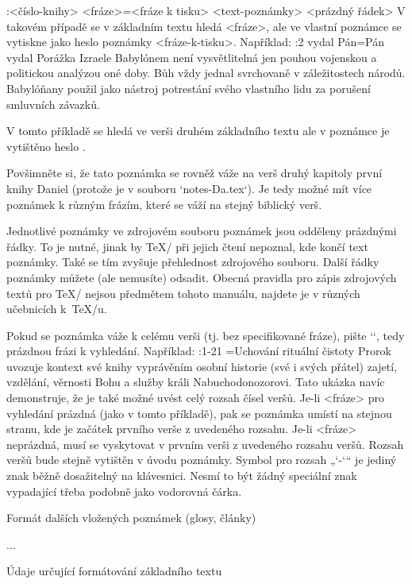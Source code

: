\begtt
{}:<číslo-knihy> {<fráze>}={<fráze k tisku>} <text-poznámky> 
<prázdný řádek>
\endtt
V takovém případě se v základním textu hledá <fráze>, ale ve vlastní
poznámce se vytiskne jako heslo poznámky <fráze-k-tisku>. Například:
\begtt
{}:2 {vydal Pán}={Pán vydal} Porážka Izraele Babylónem není vysvětlitelná
   jen pouhou vojenskou a politickou analýzou oné doby. Bůh vždy jednal svrchovaně 
   v záležitostech národů. Babylóňany použil jako nástroj potrestání svého vlastního
   lidu za porušení smluvních závazků.

\endtt
V tomto příkladě se hledá ve verši druhém základního textu  
ale v poznámce je vytištěno heslo .

Povšimněte si, že tato poznámka se rovněž váže na verš druhý kapitoly první
knihy Daniel (protože je v souboru `notes-Da.tex`). Je tedy možné mít více
poznámek k různým frázím, které se váží na stejný biblický verš. 

Jednotlivé poznámky ve zdrojovém souboru poznámek jsou odděleny prázdnými
řádky. To je nutné, jinak by \TeX/ při jejich čtení nepoznal, kde končí text
poznámky. Také se tím zvyšuje přehlednost zdrojového souboru. Další řádky
poznámky můžete (ale nemusíte) odsadit. Obecná pravidla pro zápis
zdrojových textů pro \TeX/ nejsou předmětem tohoto manuálu, najdete je v
různých učebnicích k~\TeX/u.

Pokud se poznámka váže k celému verši (tj. bez specifikované fráze), pište
`{}`, tedy prázdnou frázi k vyhledání. Například:
\begtt
{}:1-21 {}={Uchování rituální čistoty}  Prorok uvozuje kontext své knihy vyprávěním
   osobní historie (své i svých přátel) zajetí, vzdělání, věrnosti Bohu a služby 
   králi Nabuchodonozorovi.
\endtt
Tato ukázka navíc demonstruje, že je také možné uvést celý rozsah čísel veršů.
Je-li <fráze> pro vyhledání prázdná (jako v tomto příkladě), pak se poznámka
umístí na stejnou stranu, kde je začátek prvního verše z uvedeného rozsahu.
Je-li <fráze> neprázdná, musí se vyskytovat v prvním verši z uvedeného
rozsahu veršů. Rozsah veršů bude stejně vytištěn v úvodu poznámky.
Symbol pro rozsah „`-`“ je jediný znak  běžně dosažitelný na
klávesnici. Nesmí to být žádný speciální znak vypadající třeba podobně jako
vodorovná čárka.



\sec[glosy] Formát dalších vložených poznámek (glosy, články)

\TODO...

\sec[fmt] Údaje určující formátování základního textu

